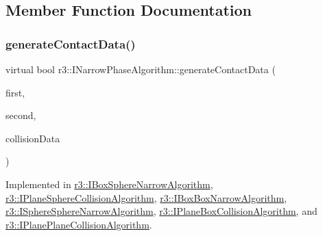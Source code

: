 \subsection{Member Function Documentation}
\mbox{\label{classr3_1_1_i_narrow_phase_algorithm_a606fe8de5fe81ff45fedb81ca74717c3}} 
\subsubsection{\texorpdfstring{generate\+Contact\+Data()}{generateContactData()}}
{\footnotesize\ttfamily virtual bool r3\+::\+I\+Narrow\+Phase\+Algorithm\+::generate\+Contact\+Data (\begin{DoxyParamCaption}\item[{\mbox{\hyperlink{classr3_1_1_rigid_body}{Rigid\+Body}} $\ast$}]{first,  }\item[{\mbox{\hyperlink{classr3_1_1_rigid_body}{Rigid\+Body}} $\ast$}]{second,  }\item[{\mbox{\hyperlink{classr3_1_1_collision_data}{Collision\+Data}} \&}]{collision\+Data }\end{DoxyParamCaption})\hspace{0.3cm}{\ttfamily [pure virtual]}}



Implemented in \mbox{\hyperlink{classr3_1_1_i_box_sphere_narrow_algorithm_aeecdb2486c6e6cbae057466f05323bdb}{r3\+::\+I\+Box\+Sphere\+Narrow\+Algorithm}}, \mbox{\hyperlink{classr3_1_1_i_plane_sphere_collision_algorithm_a5b1c334d90d381e089d59cb59a7714c5}{r3\+::\+I\+Plane\+Sphere\+Collision\+Algorithm}}, \mbox{\hyperlink{classr3_1_1_i_box_box_narrow_algorithm_a4b06ee2be38c248c59195082db64c3e3}{r3\+::\+I\+Box\+Box\+Narrow\+Algorithm}}, \mbox{\hyperlink{classr3_1_1_i_sphere_sphere_narrow_algorithm_acfdb8ae3db8c91843216651768cbd4e2}{r3\+::\+I\+Sphere\+Sphere\+Narrow\+Algorithm}}, \mbox{\hyperlink{classr3_1_1_i_plane_box_collision_algorithm_aacbbfc59a3cb174876bd5cffad22f1fc}{r3\+::\+I\+Plane\+Box\+Collision\+Algorithm}}, and \mbox{\hyperlink{classr3_1_1_i_plane_plane_collision_algorithm_a910587be6f6537f86bbcc5e3a9b40223}{r3\+::\+I\+Plane\+Plane\+Collision\+Algorithm}}.



